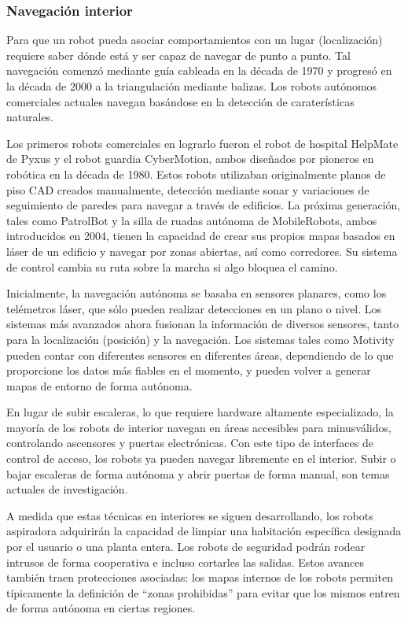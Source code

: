 \subsubsection{Navegación interior}
Para que un robot pueda asociar comportamientos con un lugar (localización) requiere saber dónde está y ser capaz de navegar de punto a punto. Tal navegación comenzó mediante guía cableada en la década de 1970 y progresó en la década de 2000 a la triangulación mediante balizas. Los robots autónomos comerciales actuales navegan basándose en la detección de caraterísticas naturales.

Los primeros robots comerciales en lograrlo fueron el robot de hospital HelpMate de Pyxus y el robot guardia CyberMotion, ambos diseñados por pioneros en robótica en la década de 1980. Estos robots utilizaban originalmente planos de piso CAD creados manualmente, detección mediante sonar y variaciones de seguimiento de paredes para navegar a través de edificios. La próxima generación, tales como PatrolBot y la silla de ruadas autónoma de MobileRobots, ambos introducidos en 2004, tienen la capacidad de crear sus propios mapas basados en láser de un edificio y navegar por zonas abiertas, así como corredores. Su sistema de control cambia su ruta sobre la marcha si algo bloquea el camino.

Inicialmente, la navegación autónoma se basaba en sensores planares, como los telémetros láser, que sólo pueden realizar detecciones en un plano o nivel. Los sistemas más avanzados ahora fusionan la información de diversos sensores, tanto para la localización (posición) y la navegación. Los sistemas tales como Motivity pueden contar con diferentes sensores en diferentes áreas, dependiendo de lo que proporcione los datos más fiables en el momento, y pueden volver a generar mapas de entorno de forma autónoma.

En lugar de subir escaleras, lo que requiere hardware altamente especializado, la mayoría de los robots de interior navegan en áreas accesibles para minusválidos, controlando ascensores y puertas electrónicas. Con este tipo de interfaces de control de acceso, los robots ya pueden navegar libremente en el interior. Subir o bajar escaleras de forma autónoma y abrir puertas de forma manual, son temas actuales de investigación.

A medida que estas técnicas en interiores se siguen desarrollando, los robots aspiradora adquirirán la capacidad de limpiar una habitación específica designada por el usuario o una planta entera. Los robots de seguridad podrán rodear intrusos de forma cooperativa e incluso cortarles las salidas. Estos avances también traen protecciones asociadas: los mapas internos de los robots permiten típicamente la definición de ``zonas prohibidas'' para evitar que los mismos entren de forma autónoma en ciertas regiones.

